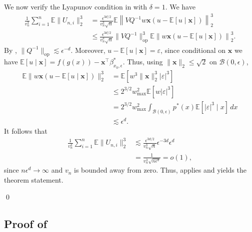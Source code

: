 \documentclass[11pt]{article}
\begin{document}
\begin{appendices}
We now verify the Lyapunov condition in  with $\delta=1$. We have
\begin{align*}
    \frac{1}{v_n^3}\sum_{i=1}^n\mathbb{E}\|U_{n,i}\|_2^3
    &=
    \frac{\epsilon^{3d/2}}{v_n^3\sqrt{n}}
    \mathbb{E}\left\|VQ^{-1}w\boldsymbol{x}(u-\mathbb{E}[u\mid \boldsymbol{x}])\right\|_2^3 \\
    &\leq
    \frac{\epsilon^{3d/2}}{v_n^3\sqrt{n}}
    \|VQ^{-1}\|_{\operatorname{op}}^3
    \mathbb{E}\left\|w\boldsymbol{x}(u-\mathbb{E}[u\mid \boldsymbol{x}])\right\|_2^3.
\end{align*}
By , $\|Q^{-1}\|_{\operatorname{op}}\lesssim\epsilon^{-d}$. Moreover, $u-\mathbb{E}[u\mid \boldsymbol{x}]=\varepsilon$, since conditional on $\boldsymbol{x}$ we have $\mathbb{E}[u\mid \boldsymbol{x}]=f(g(x))-\boldsymbol{x}^\top\beta^*_{x_0,\epsilon}$. Thus, using $\|\boldsymbol{x}\|_2\leq\sqrt{2}$ on $\mathcal{B}(0,\epsilon)$,
\begin{align*}
    \mathbb{E}\|w\boldsymbol{x}(u-\mathbb{E}[u\mid \boldsymbol{x}])\|_2^3
    &= \mathbb{E}\left[w^3\|\boldsymbol{x}\|_2^3|\varepsilon|^3\right] \\
    &\leq 2^{3/2}w_{\max}^2\mathbb{E}\left[w|\varepsilon|^3\right] \\
    &= 2^{3/2}w_{\max}^2\int_{\mathcal{B}(0,\epsilon)}
    p^*(x)\mathbb{E}[|\varepsilon|^3\mid x]\,dx \\
    &\lesssim \epsilon^d.
\end{align*}
It follows that
\begin{align*}
    \frac{1}{v_n^3}\sum_{i=1}^n\mathbb{E}\|U_{n,i}\|_2^3
    &\lesssim
    \frac{\epsilon^{3d/2}}{v_n^3\sqrt{n}}
    \epsilon^{-3d}\epsilon^d \\
    &=
    \frac{1}{v_n^3\sqrt{n\epsilon^d}}
    =o(1),
\end{align*}
since $n\epsilon^d\rightarrow\infty$ and $v_n$ is bounded away from zero. Thus,  applies and yields the theorem statement.

\qed{}

\subsection{Proof of } \label{sec: proof of reg decomp}


\end{appendices}
\end{document}
